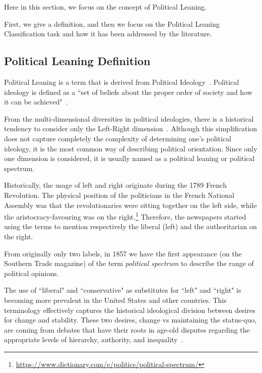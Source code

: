 Here in this section, we focus on the concept of Political Leaning.

First, we give a definition, and then we focus on the Political Leaning Classification task and how it has been addressed by the literature.

\subsection{Political Leaning Definition}

Political Leaning is a term that is derived from Political Ideology~\citep{jost2009political}.
Political ideology is defined as a ``set of beliefs about the proper order of society and how it can be achieved"~\citep[p.~64]{erikson2015american}.

From the multi-dimensional diversities in political ideologies, there is a historical tendency to consider only the Left-Right dimension~\citep{jost2009political}.
Although this simplification does not capture completely the complexity of determining one's political ideology, it is the most common way of describing political orientation.
Since only one dimension is considered, it is usually named as a political leaning or political spectrum.


Historically, the usage of left and right originate during the 1789 French Revolution. The physical position of the politicians in the French National Assembly was that the revolutionaries were sitting together on the left side, while the aristocracy-favouring was on the right.\footnote{\url{https://www.dictionary.com/e/politics/political-spectrum/}}
Therefore, the newspapers started using the terms to mention respectively the liberal (left) and the authoritarian on the right.

From originally only two labels, in 1857 we have the first appearance (on the Southern Trade magazine) of the term \emph{political spectrum} to describe the range of political opinions.


The use of ``liberal" and ``conservative" as substitutes for ``left" and ``right" is becoming more prevalent in the United States and other countries.
This terminology effectively captures the historical ideological division between desires for change and stability.
These two desires, change vs maintaining the status-quo, are coming from debates that have their roots in age-old disputes regarding the appropriate levels of hierarchy, authority, and inequality~\citep{bobbio1996left}.


